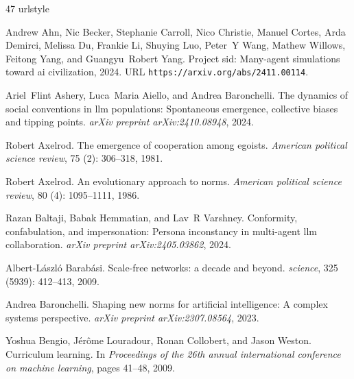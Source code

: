 \begin{thebibliography}{47}
\providecommand{\natexlab}[1]{#1}
\providecommand{\url}[1]{\texttt{#1}}
\expandafter\ifx\csname urlstyle\endcsname\relax
  \providecommand{\doi}[1]{doi: #1}\else
  \providecommand{\doi}{doi: \begingroup \urlstyle{rm}\Url}\fi

Andrew Ahn, Nic Becker, Stephanie Carroll, Nico Christie, Manuel Cortes, Arda Demirci, Melissa Du, Frankie Li, Shuying Luo, Peter~Y Wang, Mathew Willows, Feitong Yang, and Guangyu~Robert Yang.
\newblock Project sid: Many-agent simulations toward ai civilization, 2024.
\newblock URL \url{https://arxiv.org/abs/2411.00114}.

Ariel~Flint Ashery, Luca~Maria Aiello, and Andrea Baronchelli.
\newblock The dynamics of social conventions in llm populations: Spontaneous emergence, collective biases and tipping points.
\newblock \emph{arXiv preprint arXiv:2410.08948}, 2024.

Robert Axelrod.
\newblock The emergence of cooperation among egoists.
\newblock \emph{American political science review}, 75 (2): 306--318, 1981.

Robert Axelrod.
\newblock An evolutionary approach to norms.
\newblock \emph{American political science review}, 80 (4): 1095--1111, 1986.

Razan Baltaji, Babak Hemmatian, and Lav~R Varshney.
\newblock Conformity, confabulation, and impersonation: Persona inconstancy in multi-agent llm collaboration.
\newblock \emph{arXiv preprint arXiv:2405.03862}, 2024.

Albert-L{\'a}szl{\'o} Barab{\'a}si.
\newblock Scale-free networks: a decade and beyond.
\newblock \emph{science}, 325 (5939): 412--413, 2009.

Andrea Baronchelli.
\newblock Shaping new norms for artificial intelligence: A complex systems perspective.
\newblock \emph{arXiv preprint arXiv:2307.08564}, 2023.

Yoshua Bengio, J{\'e}r{\^o}me Louradour, Ronan Collobert, and Jason Weston.
\newblock Curriculum learning.
\newblock In \emph{Proceedings of the 26th annual international conference on machine learning}, pages 41--48, 2009.


\end{thebibliography}
